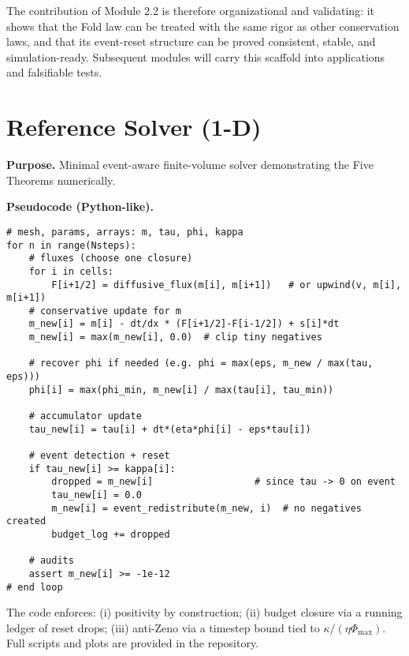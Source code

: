 \documentclass[11pt]{article}
\begin{document}
The contribution of Module 2.2 is therefore organizational and validating: 
it shows that the Fold law can be treated with the same rigor as other 
conservation laws, and that its event-reset structure can be proved consistent, 
stable, and simulation-ready. Subsequent modules will carry this scaffold 
into applications and falsifiable tests.


\appendix
\section{Reference Solver (1-D) }\label{app:solver}

\noindent\textbf{Purpose.}
Minimal event-aware finite-volume solver demonstrating the Five Theorems numerically.

\medskip
\noindent\textbf{Pseudocode (Python-like).}
\begin{verbatim}
# mesh, params, arrays: m, tau, phi, kappa
for n in range(Nsteps):
    # fluxes (choose one closure)
    for i in cells:
        F[i+1/2] = diffusive_flux(m[i], m[i+1])   # or upwind(v, m[i], m[i+1])
    # conservative update for m
    m_new[i] = m[i] - dt/dx * (F[i+1/2]-F[i-1/2]) + s[i]*dt
    m_new[i] = max(m_new[i], 0.0)  # clip tiny negatives

    # recover phi if needed (e.g. phi = max(eps, m_new / max(tau, eps)))
    phi[i] = max(phi_min, m_new[i] / max(tau[i], tau_min))

    # accumulator update
    tau_new[i] = tau[i] + dt*(eta*phi[i] - eps*tau[i])

    # event detection + reset
    if tau_new[i] >= kappa[i]:
        dropped = m_new[i]                  # since tau -> 0 on event
        tau_new[i] = 0.0
        m_new[i] = event_redistribute(m_new, i)  # no negatives created
        budget_log += dropped

    # audits
    assert m_new[i] >= -1e-12
# end loop
\end{verbatim}

\noindent The code enforces: (i) positivity by construction; (ii) budget closure via
a running ledger of reset drops; (iii) anti-Zeno via a timestep bound tied to
$\kappa/(\eta \Phi_{\max})$. Full scripts and plots are provided in the repository.




\end{document}
